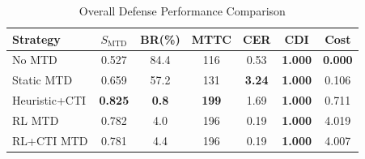 \begin{table}[!t]
\centering
\caption{Overall Defense Performance Comparison}
\label{tab:overall_comparison}
\begin{tabular}{@{}lcccccc@{}}
\toprule
\textbf{Strategy} & $S_{\mathrm{MTD}}$ & \textbf{BR(\%)} & \textbf{MTTC} & \textbf{CER} & \textbf{CDI} & \textbf{Cost} \\
\midrule
No MTD & 0.527 & 84.4 & 116 & 0.53 & \textbf{1.000} & \textbf{0.000} \\
Static MTD & 0.659 & 57.2 & 131 & \textbf{3.24} & \textbf{1.000} & 0.106 \\
Heuristic+CTI & \textbf{0.825} & \textbf{0.8} & \textbf{199} & 1.69 & \textbf{1.000} & 0.711 \\
RL MTD & 0.782 & 4.0 & 196 & 0.19 & \textbf{1.000} & 4.019 \\
RL+CTI MTD & 0.781 & 4.4 & 196 & 0.19 & \textbf{1.000} & 4.007 \\
\bottomrule
\end{tabular}
\end{table}
